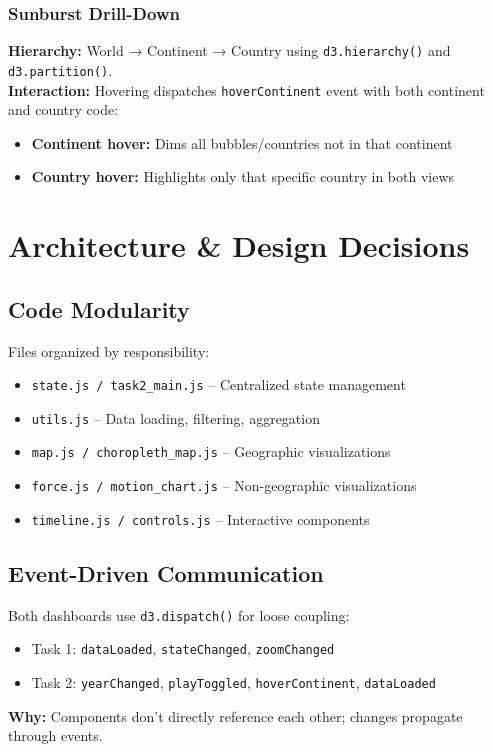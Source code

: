 \documentclass[11pt,a4paper]{article}
\begin{document}
\subsubsection{Sunburst Drill-Down}
\textbf{Hierarchy:} World → Continent → Country using \texttt{d3.hierarchy()} and \texttt{d3.partition()}.\\
\textbf{Interaction:} Hovering dispatches \texttt{hoverContinent} event with both continent and country code:
\begin{itemize}[noitemsep]
    \item \textbf{Continent hover:} Dims all bubbles/countries not in that continent
    \item \textbf{Country hover:} Highlights only that specific country in both views
\end{itemize}

\section{Architecture \& Design Decisions}

\subsection{Code Modularity}
Files organized by responsibility:
\begin{itemize}[noitemsep]
    \item \texttt{state.js / task2\_main.js} -- Centralized state management
    \item \texttt{utils.js} -- Data loading, filtering, aggregation
    \item \texttt{map.js / choropleth\_map.js} -- Geographic visualizations
    \item \texttt{force.js / motion\_chart.js} -- Non-geographic visualizations
    \item \texttt{timeline.js / controls.js} -- Interactive components
\end{itemize}

\subsection{Event-Driven Communication}
Both dashboards use \texttt{d3.dispatch()} for loose coupling:
\begin{itemize}[noitemsep]
    \item Task 1: \texttt{dataLoaded}, \texttt{stateChanged}, \texttt{zoomChanged}
    \item Task 2: \texttt{yearChanged}, \texttt{playToggled}, \texttt{hoverContinent}, \texttt{dataLoaded}
\end{itemize}
\textbf{Why:} Components don't directly reference each other; changes propagate through events.
\end{document}
